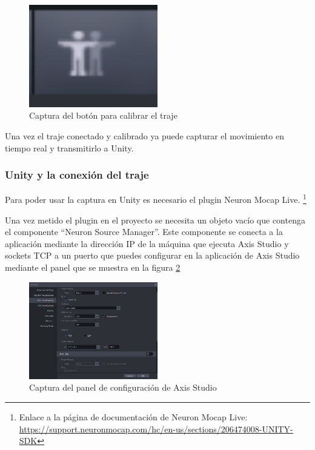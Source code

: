 \begin{figure}[H]
	\centering
	\includegraphics[width=0.5\textwidth]{Imagenes/Bitmap/Calibrar.PNG}
	\caption{Captura del botón para calibrar el traje}
	\label{fig:BotonCalibrar}
\end{figure}

Una vez el traje conectado y calibrado ya puede capturar el movimiento en tiempo real y transmitirlo a Unity.
\subsubsection{Unity y la conexión del traje}
\label{subsec:NeuronMocapLive}
Para poder usar la captura en Unity es necesario el plugin Neuron Mocap Live. \footnote{Enlace a la página de documentación de Neuron Mocap Live: \url{https://support.neuronmocap.com/hc/en-us/sections/206474008-UNITY-SDK}}

Una vez metido el plugin en el proyecto se necesita un objeto vacío que contenga el componente ``Neuron Source Manager''.
Este componente se conecta a la aplicación mediante la dirección IP de la máquina que ejecuta Axis Studio y sockets TCP a un puerto que puedes configurar en la aplicación de Axis Studio mediante el panel que se muestra en la figura \ref{fig:SettingAxis}

\begin{figure}[H]
	\centering
	\includegraphics[width=0.5\textwidth]{Imagenes/Bitmap/SettingsAxis.PNG}
	\caption{Captura del panel de configuración de Axis Studio}
	\label{fig:SettingAxis}
\end{figure}

